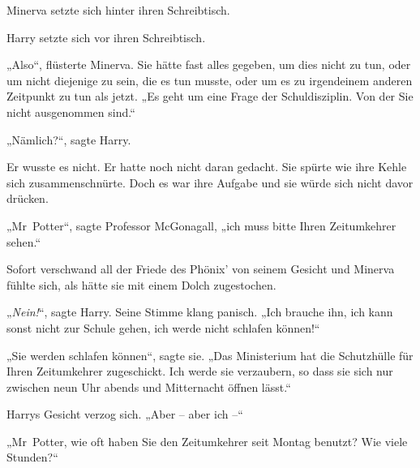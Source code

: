Minerva setzte sich hinter ihren Schreibtisch.

Harry setzte sich vor ihren Schreibtisch.

„Also“, flüsterte Minerva. Sie hätte fast alles gegeben, um dies nicht zu tun, oder um nicht diejenige zu sein, die es tun musste, oder um es zu irgendeinem anderen Zeitpunkt zu tun als jetzt. „Es geht um eine Frage der Schuldisziplin. Von der Sie nicht ausgenommen sind.“

„Nämlich?“, sagte Harry.

Er wusste es nicht. Er hatte noch nicht daran gedacht. Sie spürte wie ihre Kehle sich zusammenschnürte. Doch es war ihre Aufgabe und sie würde sich nicht davor drücken.

„Mr~Potter“, sagte Professor McGonagall, „ich muss bitte Ihren Zeitumkehrer sehen.“

Sofort verschwand all der Friede des Phönix’ von seinem Gesicht und Minerva fühlte sich, als hätte sie mit einem Dolch zugestochen.

„\emph{Nein!}“, sagte Harry. Seine Stimme klang panisch. „Ich brauche ihn, ich kann sonst nicht zur Schule gehen, ich werde nicht schlafen können!“

„Sie werden schlafen können“, sagte sie. „Das Ministerium hat die Schutzhülle für Ihren Zeitumkehrer zugeschickt. Ich werde sie verzaubern, so dass sie sich nur zwischen neun Uhr abends und Mitternacht öffnen lässt.“

Harrys Gesicht verzog sich. „Aber – aber ich –“

„Mr~Potter, wie oft haben Sie den Zeitumkehrer seit Montag benutzt? Wie viele Stunden?“

